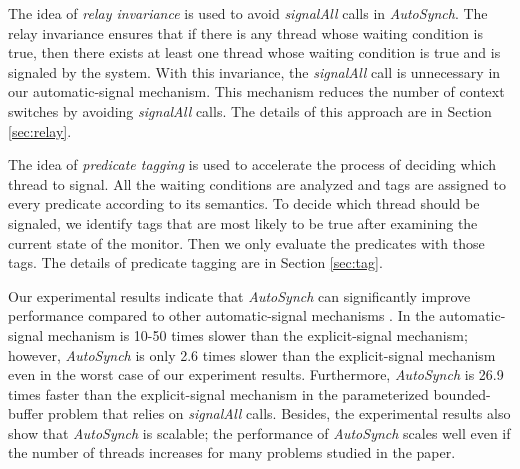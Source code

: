 \documentclass{sigplanconf}
\begin{document}
The idea of {\em relay invariance} is used to avoid {\em signalAll} calls in {\em
AutoSynch}.
The relay invariance ensures that if there is any thread whose waiting condition is true, then
there exists at least one thread whose waiting condition is  true and is signaled by the system.
With this invariance, the {\em signalAll} call 
is unnecessary in our automatic-signal mechanism. This mechanism reduces 
the number of context switches by avoiding {\em signalAll} calls. 
The details of this approach are in Section \ref{sec:relay}.


The idea of {\em predicate tagging} is used to accelerate the process of deciding which thread to signal.
All the waiting conditions are analyzed and tags are assigned to every predicate
according to its semantics. To decide which thread should be 
signaled, we identify tags that are most likely to be true after examining the 
current state of the monitor. Then we only evaluate the predicates with 
those tags. 
The details of predicate tagging are in Section \ref{sec:tag}.

Our experimental results indicate that {\em AutoSynch} can significantly improve
performance compared to other automatic-signal mechanisms \cite{bh05}. In \cite{bfc95,bh05}
the automatic-signal mechanism is 10-50 times
slower than the explicit-signal mechanism; however, {\em AutoSynch} is 
only 2.6 times slower than the explicit-signal mechanism even in the worst 
case of our experiment results. Furthermore, {\em AutoSynch} is 26.9
times faster than the explicit-signal mechanism in the parameterized
bounded-buffer problem that relies on 
{\em signalAll} calls. Besides, the experimental results also show that {\em AutoSynch} 
is scalable; the performance of {\em AutoSynch} scales well even if the number of 
threads increases for many problems studied in the paper. 
\end{document}
